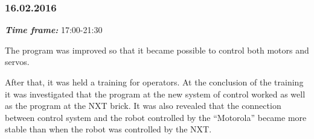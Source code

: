 \subsubsection{16.02.2016}
\textit{\textbf{Time frame:}} 17:00-21:30 

The program was improved so that it became possible to control both motors and servos. 

After that, it was held a training for operators. At the conclusion of the training it was investigated that the program at the new system of control worked as well as the program at the NXT brick. It was also revealed that the connection between control system and the robot controlled by the “Motorola” became more stable than when the robot was controlled by the NXT.

